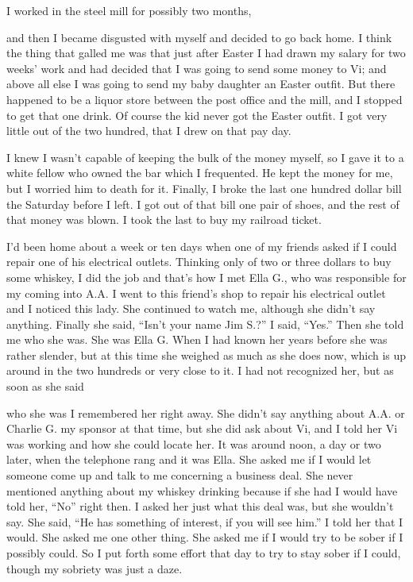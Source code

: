 \begin{biblechapter}
I worked in the steel mill for possibly two months,

and then I became disgusted with myself and decided to go back home. I think the thing that galled me was that just after Easter I had drawn my salary for two weeks’ work and had decided that I was going to send some money to Vi; and above all else I was going to send my baby daughter an Easter outfit. But there happened to be a liquor store between the post office and the mill, and I stopped to get that one drink. Of course the kid never got the Easter outfit. I got very little out of the two hundred, that I drew on that pay day.

I knew I wasn’t capable of keeping the bulk of the money myself, so I gave it to a white fellow who owned the bar which I frequented. He kept the money for me, but I worried him to death for it. Finally, I broke the last one hundred dollar bill the Saturday before I left. I got out of that bill one pair of shoes, and the rest of that money was blown. I took the last to buy my railroad ticket.

I’d been home about a week or ten days when one of my friends asked if I could repair one of his electrical outlets. Thinking only of two or three dollars to buy some whiskey, I did the job and that’s how I met Ella G., who was responsible for my coming into A.A. I went to this friend’s shop to repair his electrical outlet and I noticed this lady. She continued to watch me, although she didn’t say anything. Finally she said, “Isn’t your name Jim S.?” I said, “Yes.” Then she told me who she was. She was Ella G. When I had known her years before she was rather slender, but at this time she weighed as much as she does now, which is up around in the two hundreds or very close to it. I had not recognized her, but as soon as she said

who she was I remembered her right away. She didn’t say anything about A.A. or Charlie G. my sponsor at that time, but she did ask about Vi, and I told her Vi was working and how she could locate her. It was around noon, a day or two later, when the telephone rang and it was Ella. She asked me if I would let someone come up and talk to me concerning a business deal. She never mentioned anything about my whiskey drinking because if she had I would have told her, “No” right then. I asked her just what this deal was, but she wouldn’t say. She said, “He has something of interest, if you will see him.” I told her that I would. She asked me one other thing. She asked me if I would try to be sober if I possibly could. So I put forth some effort that day to try to stay sober if I could, though my sobriety was just a daze.


\end{biblechapter}
